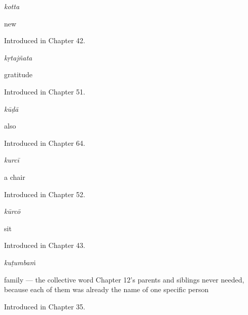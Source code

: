 \noindent\begin{minipage}[t]{\linewidth}
\raggedright
\textbf{}\enspace\emph{kotta}\par
\small new\par
\footnotesize Introduced in Chapter 42.
\end{minipage}\par\medskip

\noindent\begin{minipage}[t]{\linewidth}
\raggedright
\textbf{}\enspace\emph{kṛtajñata}\par
\small gratitude\par
\footnotesize Introduced in Chapter 51.
\end{minipage}\par\medskip

\noindent\begin{minipage}[t]{\linewidth}
\raggedright
\textbf{}\enspace\emph{kūḍā}\par
\small also\par
\footnotesize Introduced in Chapter 64.
\end{minipage}\par\medskip

\noindent\begin{minipage}[t]{\linewidth}
\raggedright
\textbf{}\enspace\emph{kurcī}\par
\small a chair\par
\footnotesize Introduced in Chapter 52.
\end{minipage}\par\medskip

\noindent\begin{minipage}[t]{\linewidth}
\raggedright
\textbf{}\enspace\emph{kūrcō}\par
\small sit\par
\footnotesize Introduced in Chapter 43.
\end{minipage}\par\medskip

\noindent\begin{minipage}[t]{\linewidth}
\raggedright
\textbf{}\enspace\emph{kuṭumbaṁ}\par
\small family — the collective word Chapter 12's parents and siblings never needed, because each of them was already the name of one specific person\par
\footnotesize Introduced in Chapter 35.
\end{minipage}\par\medskip

